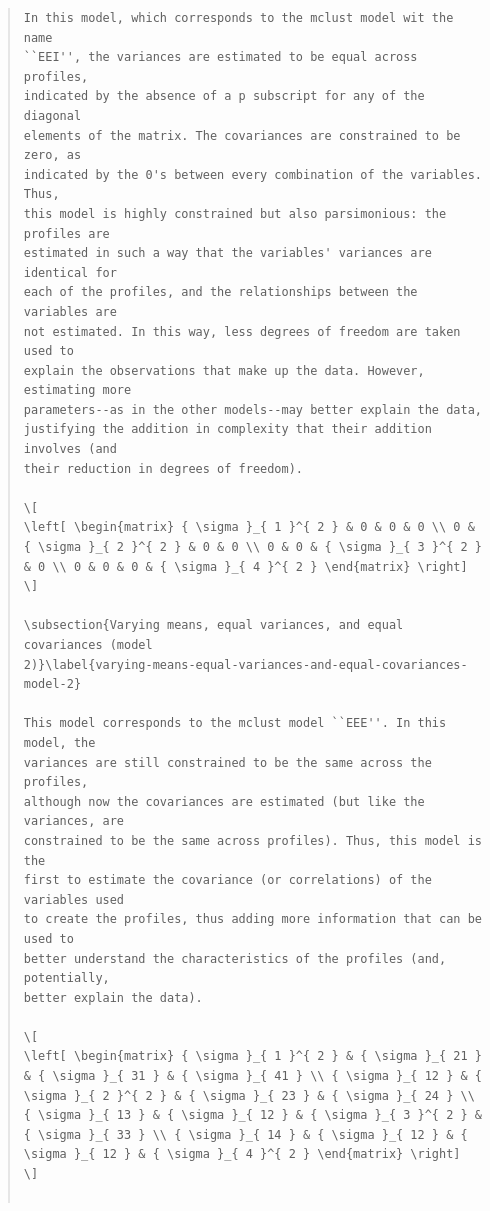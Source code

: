 \documentclass[]{msu-thesis}
\theoremstyle{definition}
\theoremstyle{definition}
\theoremstyle{definition}
\theoremstyle{remark}
\begin{document}
\begin{quote}
\begin{lstlisting}
In this model, which corresponds to the mclust model wit the name
``EEI'', the variances are estimated to be equal across profiles,
indicated by the absence of a p subscript for any of the diagonal
elements of the matrix. The covariances are constrained to be zero, as
indicated by the 0's between every combination of the variables. Thus,
this model is highly constrained but also parsimonious: the profiles are
estimated in such a way that the variables' variances are identical for
each of the profiles, and the relationships between the variables are
not estimated. In this way, less degrees of freedom are taken used to
explain the observations that make up the data. However, estimating more
parameters--as in the other models--may better explain the data,
justifying the addition in complexity that their addition involves (and
their reduction in degrees of freedom).

\[
\left[ \begin{matrix} { \sigma }_{ 1 }^{ 2 } & 0 & 0 & 0 \\ 0 & { \sigma }_{ 2 }^{ 2 } & 0 & 0 \\ 0 & 0 & { \sigma }_{ 3 }^{ 2 } & 0 \\ 0 & 0 & 0 & { \sigma }_{ 4 }^{ 2 } \end{matrix} \right]
\]

\subsection{Varying means, equal variances, and equal covariances (model
2)}\label{varying-means-equal-variances-and-equal-covariances-model-2}

This model corresponds to the mclust model ``EEE''. In this model, the
variances are still constrained to be the same across the profiles,
although now the covariances are estimated (but like the variances, are
constrained to be the same across profiles). Thus, this model is the
first to estimate the covariance (or correlations) of the variables used
to create the profiles, thus adding more information that can be used to
better understand the characteristics of the profiles (and, potentially,
better explain the data).

\[
\left[ \begin{matrix} { \sigma }_{ 1 }^{ 2 } & { \sigma }_{ 21 } & { \sigma }_{ 31 } & { \sigma }_{ 41 } \\ { \sigma }_{ 12 } & { \sigma }_{ 2 }^{ 2 } & { \sigma }_{ 23 } & { \sigma }_{ 24 } \\ { \sigma }_{ 13 } & { \sigma }_{ 12 } & { \sigma }_{ 3 }^{ 2 } & { \sigma }_{ 33 } \\ { \sigma }_{ 14 } & { \sigma }_{ 12 } & { \sigma }_{ 12 } & { \sigma }_{ 4 }^{ 2 } \end{matrix} \right]
\]


\end{lstlisting}
\end{quote}
\end{document}
